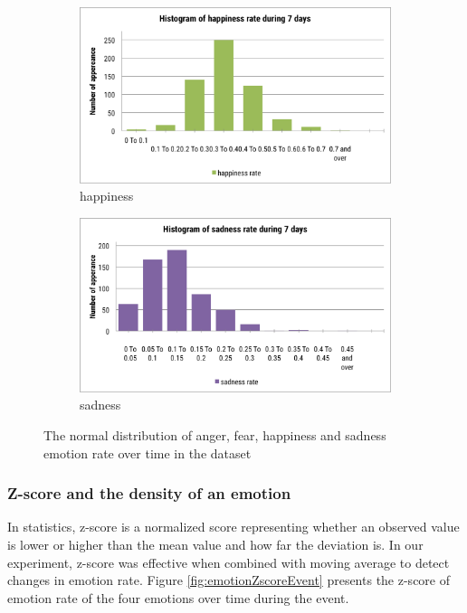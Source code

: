 \begin{figure}[htb!]
\begin{subfigure}{0.5\textwidth}
\end{subfigure}
\begin{subfigure}{0.5\textwidth}
\centering    
\includegraphics[width=0.8\linewidth]{HistogramHappinessWeek}
\caption{happiness}
\label{fig:histogramHappinessWeek}
\end{subfigure}%
\begin{subfigure}{0.5\textwidth}
\centering    
\includegraphics[width=0.8\linewidth]{HistogramSadnessWeek}
\caption{sadness}
\label{fig:histogramSadnessWeek}
\end{subfigure}
\caption{The normal distribution of anger, fear, happiness and sadness emotion rate over time in the dataset}
\label{fig:histogramWeek}
\end{figure}

\subsubsection{Z-score and the density of an emotion}
In statistics, z-score is a normalized score representing whether an observed value is lower or higher than the mean value and how far the deviation is. In our experiment, z-score was effective when combined with moving average to detect changes in emotion rate. Figure \ref{fig:emotionZscoreEvent} presents the z-score of emotion rate of the four emotions over time during the event.

